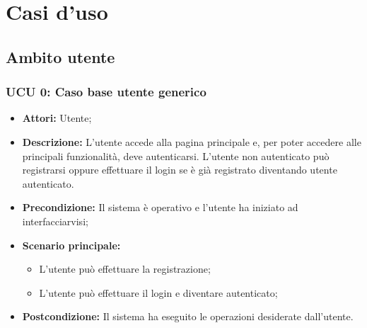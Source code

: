 \section{Casi d'uso}

\subsection{Ambito utente}

\subsubsection{UCU 0: Caso base utente generico}

\begin{itemize}
\item \textbf{Attori:} Utente;
\item \textbf{Descrizione:} L'utente accede alla pagina principale e, per poter accedere alle principali funzionalità, deve autenticarsi.
L'utente non autenticato può registrarsi oppure effettuare il login se è già registrato diventando utente autenticato.
\item \textbf{Precondizione:} Il sistema è operativo e l'utente ha iniziato ad interfacciarvisi;
\item \textbf{Scenario principale:}
\begin{itemize}
\item L'utente può effettuare la registrazione;
\item L'utente può effettuare il login e diventare autenticato;
\end{itemize}
\item \textbf{Postcondizione:} Il sistema ha eseguito le operazioni desiderate dall'utente.
\end{itemize}

